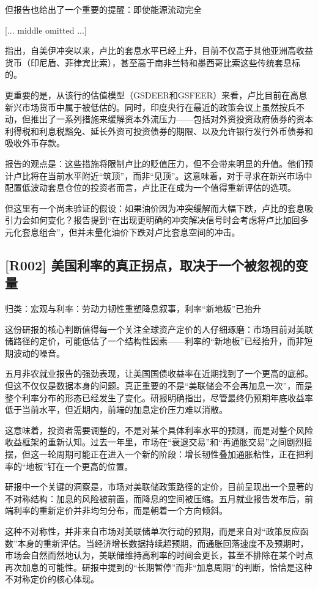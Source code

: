 \documentclass[11pt]{ctexart}
\begin{document}
但报告也给出了一个重要的提醒：即使能源流动完全

[... middle omitted ...]

指出，自美伊冲突以来，卢比的套息水平已经上升，目前不仅高于其他亚洲高收益货币（印尼盾、菲律宾比索），甚至高于南非兰特和墨西哥比索这些传统套息标的。

更重要的是，从该行的估值模型（GSDEER和GSFEER）来看，卢比目前在高息新兴市场货币中属于被低估的。同时，印度央行在最近的政策会议上虽然按兵不动，但推出了一系列措施来缓解资本外流压力——包括对外资投资政府债券的资本利得税和利息税豁免、延长外资可投资债券的期限、以及允许银行发行外币债券和吸收外币存款。

报告的观点是：这些措施将限制卢比的贬值压力，但不会带来明显的升值。他们预计卢比将在当前水平附近“筑顶”，而非“见顶”。这意味着，对于寻求在新兴市场中配置低波动套息仓位的投资者而言，卢比正在成为一个值得重新评估的选项。

但这里有一个尚未验证的假设：如果油价因为冲突缓解而大幅下跌，卢比的套息吸引力会如何变化？报告提到“在出现更明确的冲突解决信号时会考虑将卢比加回多元化套息组合”，但并未量化油价下跌对卢比套息空间的冲击。

\subsection{[R002] 美国利率的真正拐点，取决于一个被忽视的变量}
{\small\color{refgray}归类：宏观与利率：劳动力韧性重塑降息叙事，利率“新地板”已抬升}

这份研报的核心判断值得每一个关注全球资产定价的人仔细琢磨：市场目前对美联储路径的定价，可能低估了一个结构性因素——利率的“新地板”已经抬升，而非短期波动的噪音。

五月非农就业报告的强劲表现，让美国国债收益率在近期找到了一个更高的底部。但这不仅仅是数据本身的问题。真正重要的不是“美联储会不会再加息一次”，而是整个利率分布的形态已经发生了变化。研报明确指出，尽管最终仍预期年底收益率低于当前水平，但近期内，前端的加息定价压力难以消散。

这意味着，投资者需要调整的，不是对某个具体利率水平的预测，而是对整个风险收益框架的重新认知。过去一年里，市场在“衰退交易”和“再通胀交易”之间剧烈摇摆，但这一轮周期可能正在进入一个新的阶段：增长韧性叠加通胀粘性，正在把利率的“地板”钉在一个更高的位置。

研报中一个关键的洞察是，市场对美联储政策路径的定价，目前呈现出一个显著的不对称结构：加息的风险被前置，而降息的空间被压缩。五月就业报告发布后，前端利率的重新定价并非均匀分布，而是朝着一个方向倾斜。

这种不对称性，并非来自市场对美联储单次行动的预期，而是来自对“政策反应函数”本身的重新评估。当经济增长数据持续超预期，而通胀回落速度不及预期时，市场会自然而然地认为，美联储维持高利率的时间会更长，甚至不排除在某个时点再次加息的可能性。研报中提到的“长期暂停”而非“加息周期”的判断，恰恰是这种不对称定价的核心体现。
\end{document}
